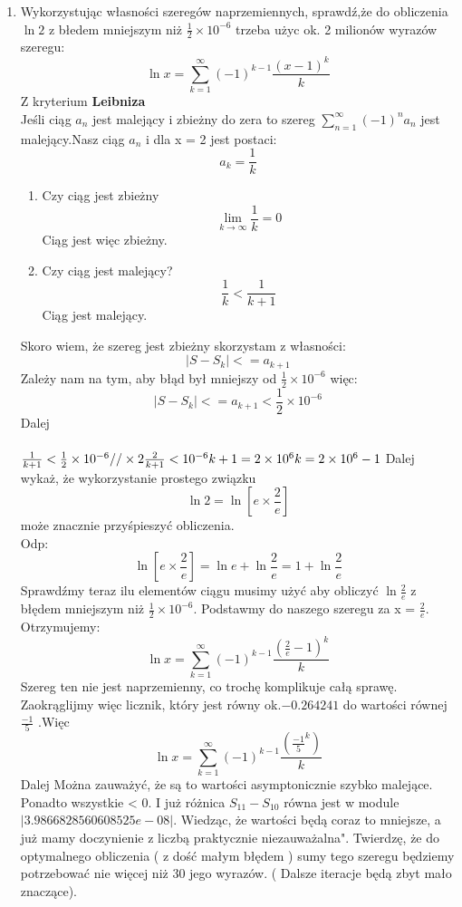 \documentclass[fleqn]{article}
\begin{document}
\begin{enumerate}
  \item Wykorzystując własności szeregów naprzemiennych, sprawdź,że do obliczenia $ \ln2 $ z błedem mniejszym niż
  $\frac{1}{2}\times 10^{-6} $ trzeba użyc ok. 2 milionów wyrazów szeregu:\\
  \[\ln x = \sum_{k=1}^\infty(-1)^{k-1}\frac{(x-1)^k}{k}\]
   Z kryterium \textbf{Leibniza}\\
   Jeśli ciąg $a_{n}$ jest malejący i zbieżny do zera to szereg $\sum_{n=1}^\infty(-1)^{n}a_{n}$ jest malejący.Nasz ciąg $a_{n}$ i dla x = 2 jest postaci:
   \[a_{k} = \frac{1}{k}\]
    \begin{enumerate}
   \item Czy ciąg jest zbieżny
   \[\lim_{k \rightarrow \infty}\frac{1}{k} = 0\]
   Ciąg jest więc zbieżny.
   \item Czy ciąg jest malejący?
   \[\frac{1}{k} < \frac{1}{k+1}\]
   Ciąg jest malejący.
   \end{enumerate}
     Skoro wiem, że szereg jest zbieżny skorzystam z własności:
   \[|S - S_{k}| <= a_{k+1}\]
    Zależy nam na tym, aby błąd był mniejszy od $\frac{1}{2}\times 10^{-6}$ więc:
   \[|S - S_{k}| <= a_{k+1} < \frac{1}{2}\times 10^{-6}\]
   Dalej \\ \\ 
   $
   \frac{1}{k+1} <  \frac{1}{2}\times 10^{-6} // \times 2 \newline \newline
   \frac{2}{k+1} <  10^{-6} \\ \\
   k + 1= 2 \times 10^{6} \\ \\
   k = 2 \times 10^{6} - 1 \\ \\
   $
   Dalej wykaż, że wykorzystanie prostego związku \[\ln 2 = \ln[e\times\frac{2}{e}]\] może znacznie przyśpieszyć obliczenia.
   \\Odp:
   \\
   \[\ln[e\times\frac{2}{e}] = \ln e + \ln \frac{2}{e} = 1 + \ln \frac{2}{e}\]
   Sprawdźmy teraz ilu elementów ciągu musimy użyć aby obliczyć $ \ln \frac{2}{e} $ z błędem mniejszym niż $\frac{1}{2}\times 10^{-6} $.
   Podstawmy do naszego szeregu za x = $ \frac{2}{e}  $. Otrzymujemy:\\
   \[\ln x = \sum_{k=1}^\infty(-1)^{k-1}\frac{(\frac{2}{e}-1)^k}{k}\]
   Szereg ten nie jest naprzemienny, co trochę komplikuje całą sprawę.\\ Zaokrąglijmy więc licznik, który jest równy ok.$ -0.264241 $ do wartości równej $ \frac{-1}{5} $ .Więc\\
  \[\ln x = \sum_{k=1}^\infty(-1)^{k-1}\frac{(\frac{-1}{5}^{k})}{k}\]
  Dalej
  Można zauważyć, że są to wartości asymptonicznie szybko malejące. Ponadto wszystkie < 0. I już różnica $ S_{11} - S_{10} $ równa jest w module $ |3.9866828560608525e-08 |$. Wiedząc, że wartości będą coraz to mniejsze, a już mamy doczynienie z liczbą praktycznie niezauważalna". Twierdzę, że do  optymalnego obliczenia ( z dość małym błędem ) sumy tego szeregu będziemy potrzebować nie więcej niż 30 jego wyrazów. ( Dalsze iteracje będą zbyt mało znaczące).
  

\end{enumerate}
\end{document}
